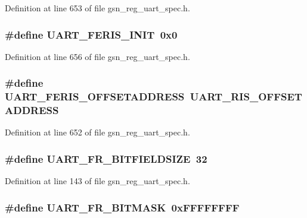 Definition at line 653 of file gsn\_\-reg\_\-uart\_\-spec.h.

\hypertarget{a00575_aecb0a92bf6d9bf52497442ed14059d6a}{
\subsubsection[{UART\_\-FERIS\_\-INIT}]{\setlength{\rightskip}{0pt plus 5cm}\#define UART\_\-FERIS\_\-INIT~0x0}}
\label{a00575_aecb0a92bf6d9bf52497442ed14059d6a}


Definition at line 656 of file gsn\_\-reg\_\-uart\_\-spec.h.

\hypertarget{a00575_a85974d3a2ecc8981197981a6c0487e1d}{
\subsubsection[{UART\_\-FERIS\_\-OFFSETADDRESS}]{\setlength{\rightskip}{0pt plus 5cm}\#define UART\_\-FERIS\_\-OFFSETADDRESS~UART\_\-RIS\_\-OFFSETADDRESS}}
\label{a00575_a85974d3a2ecc8981197981a6c0487e1d}


Definition at line 652 of file gsn\_\-reg\_\-uart\_\-spec.h.

\hypertarget{a00575_a6786737624ed6ad87a37bca8bea6e57a}{
\subsubsection[{UART\_\-FR\_\-BITFIELDSIZE}]{\setlength{\rightskip}{0pt plus 5cm}\#define UART\_\-FR\_\-BITFIELDSIZE~32}}
\label{a00575_a6786737624ed6ad87a37bca8bea6e57a}


Definition at line 143 of file gsn\_\-reg\_\-uart\_\-spec.h.

\hypertarget{a00575_a0ab3f7e6d7f957865b19a3fa54359b49}{
\subsubsection[{UART\_\-FR\_\-BITMASK}]{\setlength{\rightskip}{0pt plus 5cm}\#define UART\_\-FR\_\-BITMASK~0xFFFFFFFF}}
\label{a00575_a0ab3f7e6d7f957865b19a3fa54359b49}


